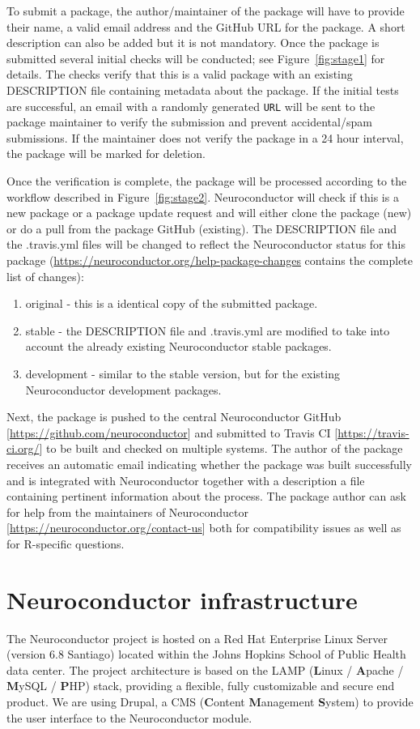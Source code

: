 \documentclass[]{elsarticle} %
\begin{document}
To submit a package, the author/maintainer of the package will have to provide their name, a valid email address and the GitHub URL for the package. A short description can also be added but it is not mandatory. Once the package is submitted several initial checks will be conducted; see Figure~\ref{fig:stage1} for details. The checks verify that this is a valid package with an existing DESCRIPTION file containing metadata about the package. If the initial tests are successful, an email with a randomly generated \texttt{URL} will be sent to the package maintainer to verify the submission and prevent accidental/spam submissions. If the maintainer does not verify the package in a 24 hour interval, the package will be marked for deletion. 

Once the verification is complete, the package will be processed according to the workflow described in Figure~\ref{fig:stage2}. Neuroconductor will check if this is a new package or a package update request and will either clone the package (new) or do a pull from the package GitHub (existing). The DESCRIPTION file and the .travis.yml files will be changed to reflect the Neuroconductor status for this package (\url{https://neuroconductor.org/help-package-changes} contains the complete list of changes):
\begin{enumerate}
\item original - this is a identical copy of the submitted package.
\item stable - the DESCRIPTION file and .travis.yml are modified to take into account the already existing Neuroconductor stable packages.
\item development - similar to the stable version, but for the existing Neuroconductor development packages.
\end{enumerate}
Next, the package is pushed to the central Neuroconductor GitHub [\url{https://github.com/neuroconductor}] and submitted to Travis CI [\url{https://travis-ci.org/}] to be built and checked on multiple systems. The author of the package receives an automatic email indicating whether the package was built successfully and is integrated with Neuroconductor together with a description a file containing pertinent information about the process. The package author can ask for help from the maintainers of Neuroconductor [\url{https://neuroconductor.org/contact-us}] both for compatibility issues as well as for R-specific questions. 

\section{Neuroconductor infrastructure}\label{sec:backend}
The Neuroconductor project is hosted on a Red Hat Enterprise Linux Server (version 6.8 Santiago) located within the Johns Hopkins School of Public Health data center. The project architecture is based on the LAMP (\textbf{L}inux / \textbf{A}pache / \textbf{M}ySQL / \textbf{P}HP) stack, providing a flexible, fully customizable and secure end product. We are using Drupal, a CMS (\textbf{C}ontent \textbf{M}anagement \textbf{S}ystem) to provide the user interface to the Neuroconductor module. 
\end{document}
